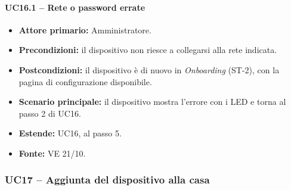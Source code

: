 \documentclass[12pt,a4paper]{article}
\newcommand{\tightlist}{\setlength{\itemsep}{1pt}\setlength{\parskip}{0pt}}
\begin{document}
\paragraph{UC16.1 -- Rete o password errate}

\begin{itemize}

\tightlist

\item \textbf{Attore primario:} Amministratore.

\item \textbf{Precondizioni:} il dispositivo non riesce a collegarsi alla rete indicata.

\item \textbf{Postcondizioni:} il dispositivo è di nuovo in \emph{Onboarding} (ST-2), con la pagina di configurazione disponibile.

\item \textbf{Scenario principale:} il dispositivo mostra l'errore con i LED e torna al passo 2 di UC16.

\item \textbf{Estende:} UC16, al passo 5.

\item \textbf{Fonte:} VE 21/10.

\end{itemize}



\subsubsection{UC17 -- Aggiunta del dispositivo alla casa}
\end{document}
